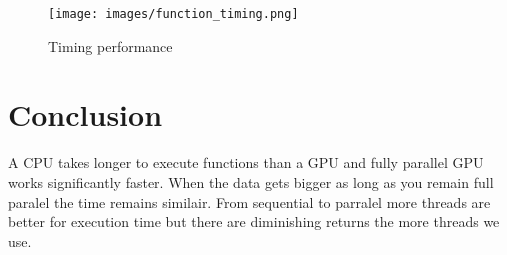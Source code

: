 \begin{figure}
   \begin{minipage}[t]{0.45\linewidth}
        \texttt{[image: images/function\_timing.png]}
        \caption{Timing performance}
        \label{figure:semiparallel}
    \end{minipage}
\end{figure}

\section{Conclusion}
\label{sec:conclusion}
A CPU takes longer to execute functions than a GPU and fully parallel GPU works significantly faster. When the data gets bigger as long as you remain full paralel the time remains similair. From sequential to parralel more threads are better for execution time but there are diminishing returns the more threads we use.

